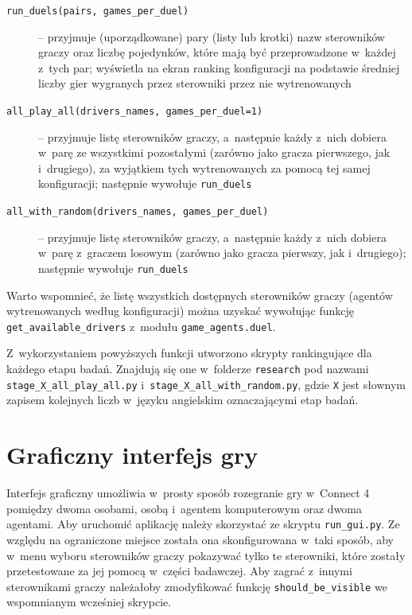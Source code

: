 \documentclass[a4paper, 12pt, oneside]{report}
\begin{document}
\begin{description}
\item[\texttt{run\_duels(pairs, games\_per\_duel)}] -- przyjmuje (uporządkowane) pary (listy lub krotki) nazw sterowników graczy oraz liczbę pojedynków, które mają być przeprowadzone w~każdej z~tych par; wyświetla na ekran ranking konfiguracji na podstawie średniej liczby gier wygranych przez sterowniki przez nie wytrenowanych
\item[\texttt{all\_play\_all(drivers\_names, games\_per\_duel=1)}] -- przyjmuje listę sterowników graczy, a~następnie każdy z~nich dobiera w~parę ze wszystkimi pozostałymi (zarówno jako gracza pierwszego, jak i~drugiego), za wyjątkiem tych wytrenowanych za pomocą tej samej konfiguracji; następnie wywołuje \texttt{run\_duels}
\item[\texttt{all\_with\_random(drivers\_names, games\_per\_duel)}] -- przyjmuje listę sterowników graczy, a~następnie każdy z~nich dobiera w~parę z~graczem losowym (zarówno jako gracza pierwszy, jak i~drugiego); następnie wywołuje \texttt{run\_duels}
\end{description}

\begin{sloppypar}
Warto wspomnieć, że listę wszystkich dostępnych sterowników graczy (agentów wytrenowanych według konfiguracji) można uzyskać wywołując funkcję \texttt{get\_available\_drivers} z~modułu \texttt{game\_agents.duel}.
\end{sloppypar}

\begin{sloppypar}
 Z~wykorzystaniem powyższych funkcji utworzono skrypty rankingujące dla każdego etapu badań. Znajdują się one w~folderze \texttt{research} pod nazwami \texttt{stage\_X\_all\_play\_all.py} i~\texttt{stage\_X\_all\_with\_random.py}, gdzie \texttt{X} jest słownym zapisem kolejnych liczb w~języku angielskim oznaczającymi etap badań.
\end{sloppypar}

\section{Graficzny interfejs gry}

Interfejs graficzny umożliwia w~prosty sposób rozegranie gry w~Connect 4 pomiędzy dwoma osobami, osobą i~agentem komputerowym oraz dwoma agentami. Aby uruchomić aplikację należy skorzystać ze skryptu \texttt{run\_gui.py}. Ze względu na ograniczone miejsce została ona skonfigurowana w~taki sposób, aby w~menu wyboru sterowników graczy pokazywać tylko te sterowniki, które zostały przetestowane za jej pomocą w~części badawczej. Aby zagrać z~innymi sterownikami graczy należałoby zmodyfikować funkcję \texttt{should\_be\_visible} we wspomnianym wcześniej skrypcie.
\end{document}
